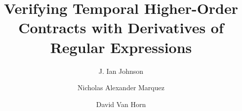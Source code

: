 \documentclass[article]{llncs}
\begin{document}
\title{Verifying Temporal Higher-Order Contracts with Derivatives of Regular Expressions}


\author{J. Ian Johnson \and Nicholas Alexander Marquez \and David Van Horn}

\maketitle

\begin{abstract}

\end{abstract}





\end{document}
